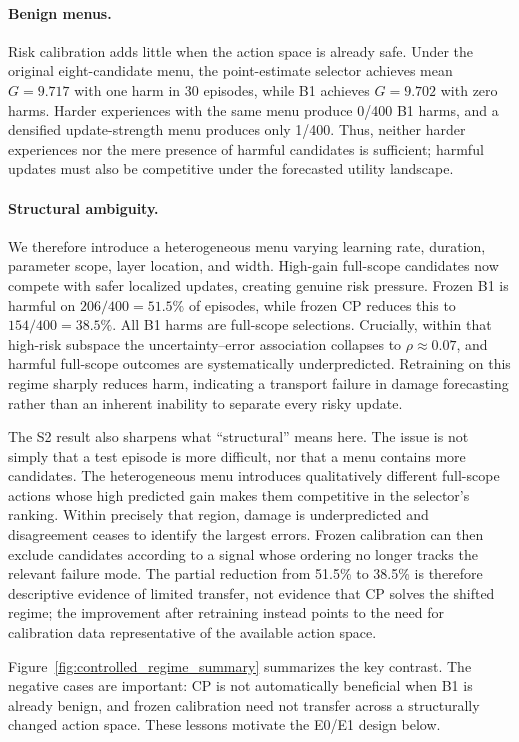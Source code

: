 \documentclass{article} %
\begin{document}
\paragraph{Benign menus.}
Risk calibration adds little when the action space is already safe. Under the
original eight-candidate menu, the point-estimate selector achieves mean
$G=9.717$ with one harm in 30 episodes, while B1 achieves $G=9.702$ with zero
harms. Harder experiences with the same menu produce 0/400 B1 harms, and a
densified update-strength menu produces only 1/400. Thus, neither harder
experiences nor the mere presence of harmful candidates is sufficient; harmful
updates must also be competitive under the forecasted utility landscape.

\paragraph{Structural ambiguity.}
We therefore introduce a heterogeneous menu varying learning rate, duration,
parameter scope, layer location, and width. High-gain full-scope candidates
now compete with safer localized updates, creating genuine risk pressure.
Frozen B1 is harmful on $206/400=51.5\%$ of episodes, while frozen CP reduces
this to $154/400=38.5\%$. All B1 harms are full-scope selections. Crucially,
within that high-risk subspace the uncertainty--error association collapses to
$\rho\approx0.07$, and harmful full-scope outcomes are systematically
underpredicted. Retraining on this regime sharply reduces harm, indicating a
transport failure in damage forecasting rather than an inherent inability to
separate every risky update.

The S2 result also sharpens what ``structural'' means here. The issue is not
simply that a test episode is more difficult, nor that a menu contains more
candidates. The heterogeneous menu introduces qualitatively different
full-scope actions whose high predicted gain makes them competitive in the
selector's ranking. Within precisely that region, damage is underpredicted and
disagreement ceases to identify the largest errors. Frozen calibration can
then exclude candidates according to a signal whose ordering no longer tracks
the relevant failure mode. The partial reduction from 51.5\% to 38.5\% is
therefore descriptive evidence of limited transfer, not evidence that CP
solves the shifted regime; the improvement after retraining instead points to
the need for calibration data representative of the available action space.

Figure~\ref{fig:controlled_regime_summary} summarizes the key contrast. The
negative cases are important: CP is not automatically beneficial when B1 is
already benign, and frozen calibration need not transfer across a structurally
changed action space. These lessons motivate the E0/E1 design below.
\end{document}
